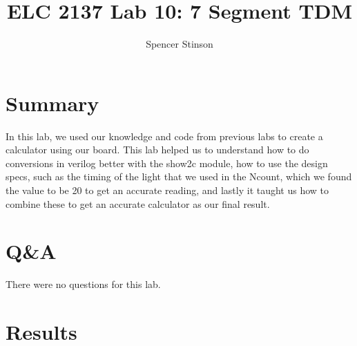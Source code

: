 \documentclass[11pt]{article}
\begin{document}
\title{ELC 2137 Lab 10: 7 Segment TDM}
\author{Spencer Stinson}

\maketitle

\section*{Summary}

In this lab, we used our knowledge and code from previous labs to create a calculator using our board. This lab helped us to understand how to do conversions in verilog better with the show2c module, how to use the design specs, such as the timing of the light that we used in the Ncount, which we found the value to be 20 to get an accurate reading, and lastly it taught us how to combine these to get an accurate calculator as our final result. 
\section*{Q\&A}
There were no questions for this lab. 

\section*{Results}
\end{document}
